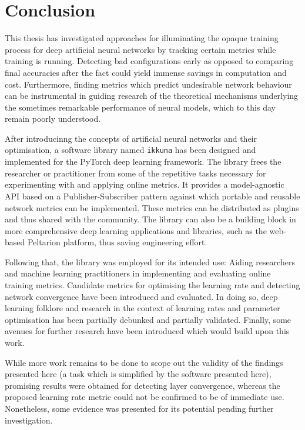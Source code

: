 \chapter{Conclusion}%

This thesis has investigated approaches for illuminating the opaque training
process for deep artificial neural networks by tracking certain metrics while
training is running. Detecting bad configurations early as opposed to comparing
final accuracies after the fact could yield immense savings in computation and
cost.  Furthermore, finding metrics which predict undesirable network behaviour
can be instrumental in guiding research of the theoretical mechanisms underlying
the sometimes remarkable performance of neural models, which to this day remain
poorly understood.

After introducinng the concepts of artificial neural networks and their
optimisation, a software library named \texttt{ikkuna} has been designed and
implemented for the PyTorch deep learning framework.  The library frees the
researcher or practitioner from some of the repetitive tasks necessary for
experimenting with and applying online metrics.  It provides a model-agnostic
API based on a Publisher-Subscriber pattern against which portable and reusable
network metrics can be implemented. These metrics can be distributed as plugins
and thus shared with the community. The library can also be a building block in
more comprehensive deep learning applications and libraries, such as the
web-based Peltarion platform, thus saving engineering effort.

Following that, the library was employed for its intended use: Aiding
researchers and machine learning practitioners in implementing and evaluating
online training metrics.  Candidate metrics for optimising the learning rate and
detecting network convergence have been introduced and evaluated. In doing so,
deep learning folklore and research in the context of learning rates and
parameter optimisation has been partially debunked and partially validated.
Finally, some avenues for further research have been introduced which would
build upon this work.

While more work remains to be done to scope out the validity of the findings
presented here (a task which is simplified by the software presented here),
promising results were obtained for detecting layer convergence, whereas the
proposed learning rate metric could not be confirmed to be of immediate use.
Nonetheless, some evidence was presented for its potential pending further
investigation.
